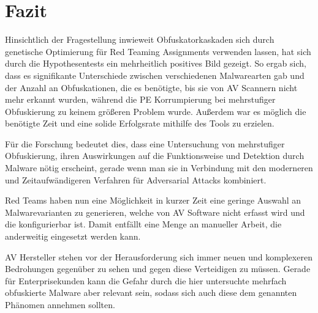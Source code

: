 \section{Fazit}
Hinsichtlich der Fragestellung inwieweit Obfuskatorkaskaden sich durch genetische Optimierung für Red Teaming Assignments verwenden lassen, hat sich durch die Hypothesentests ein mehrheitlich positives Bild gezeigt. So ergab sich, dass es signifikante Unterschiede zwischen verschiedenen Malwarearten gab und der Anzahl an Obfuskationen, die es benötigte, bis sie von AV Scannern nicht mehr erkannt wurden, während die PE Korrumpierung bei mehrstufiger Obfuskierung zu keinem größeren Problem wurde.
Außerdem war es möglich die benötigte Zeit und eine solide Erfolgsrate mithilfe des Tools zu erzielen.

Für die Forschung bedeutet dies, dass eine Untersuchung von mehrstufiger Obfuskierung, ihren Auswirkungen auf die Funktionsweise und Detektion durch Malware nötig erscheint, gerade wenn man sie in Verbindung mit den moderneren und Zeitaufwändigeren Verfahren für Adversarial Attacks kombiniert.

Red Teams haben nun eine Möglichkeit in kurzer Zeit eine geringe Auswahl an Malwarevarianten zu generieren, welche von AV Software nicht erfasst wird und die konfigurierbar ist. Damit entfällt eine Menge an manueller Arbeit, die anderweitig eingesetzt werden kann.

AV Hersteller stehen vor der Herausforderung sich immer neuen und komplexeren Bedrohungen gegenüber zu sehen und gegen diese Verteidigen zu müssen. Gerade für Enterprisekunden kann die Gefahr durch die hier untersuchte mehrfach obfuskierte Malware aber relevant sein, sodass sich auch diese dem genannten Phänomen annehmen sollten.